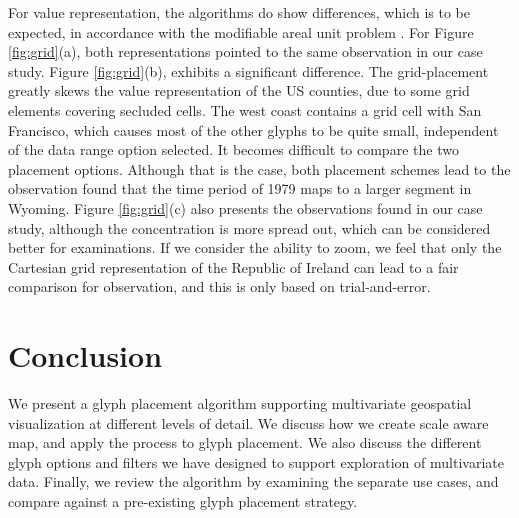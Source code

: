 For value representation, the algorithms do show differences, which is to be expected, in accordance with the modifiable areal unit problem \cite{openshaw1984modifiable}. For Figure \ref{fig:grid}(a), both representations pointed to the same observation in our case study. Figure \ref{fig:grid}(b), exhibits a significant difference. The grid-placement greatly skews the value representation of the US counties, due to some grid elements covering secluded cells. The west coast contains a grid cell with San Francisco, which causes most of the other glyphs to be quite small, independent of the data range option selected. It becomes difficult to compare the two placement options. Although that is the case, both placement schemes lead to the observation found that the time period of 1979 maps to a larger segment in Wyoming. Figure \ref{fig:grid}(c) also  presents the observations found in our case study, although the concentration is more spread out, which can be considered better for examinations. If we consider the ability to zoom, we feel that only the Cartesian grid representation of the Republic of Ireland can lead to a fair comparison for observation, and this is only based on trial-and-error.

\section{Conclusion}
We present a glyph placement algorithm supporting multivariate geospatial visualization at different levels of detail.  We discuss how we create scale aware map, and apply the process to glyph placement. We also discuss the different glyph options and filters we have designed to support exploration of multivariate data. Finally, we review the algorithm by examining the separate use cases, and compare against a pre-existing glyph placement strategy.


